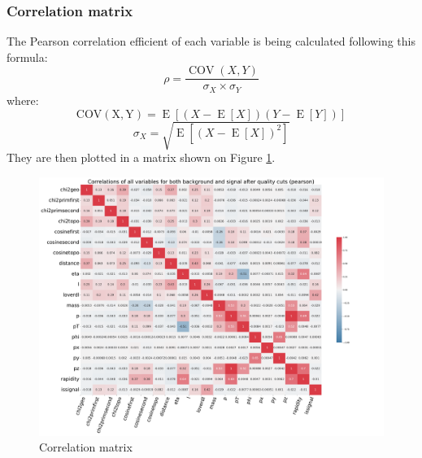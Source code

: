 \subsubsection{Correlation matrix}
The Pearson correlation efficient of each variable is being calculated following this formula:
\begin{equation}
    \rho = \frac{\operatorname{COV}(X, Y)}{\sigma_X \times \sigma_Y}
\end{equation}
where:
\begin{equation}
    \operatorname{COV(X, Y)} = \operatorname{E}\left[\left(X - \operatorname{E}\left[X\right]\right) \left(Y - \operatorname{E}\left[Y\right]\right)\right]
\end{equation}
\begin{equation}
    \sigma_X = \sqrt{\operatorname{E}\left[\left(X - \operatorname{E}\left[X\right]\right)^2\right]}
    \label{stddev}
\end{equation}
They are then plotted in a matrix shown on Figure \ref{correlation matrix}.
\begin{figure}[h!]
    \centering
    \includegraphics[width=1.1\textwidth]{img/Correlations_of_all_variables_for_both_background_and_signal_after_quality_cuts_(pearson).pdf}
    \caption{Correlation matrix}
    \label{correlation matrix}
\end{figure}
\clearpage

